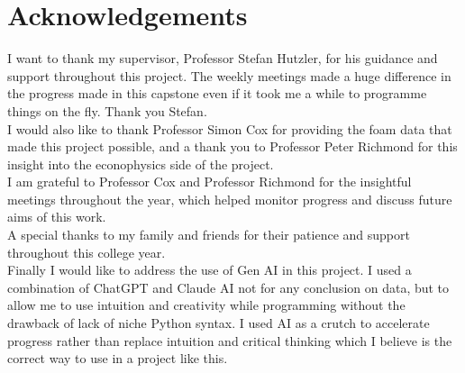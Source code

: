 \section*{Acknowledgements} \label{sec:acknowledgements}

I want to thank my supervisor, Professor Stefan Hutzler, for his guidance and support throughout this project. The weekly meetings made a huge difference in the progress made in this capstone even if it took me a while to programme things on the fly. Thank you Stefan.\\

I would also like to thank Professor Simon Cox for providing the foam data that made this project possible, and a thank you to Professor Peter Richmond for this insight into the econophysics side of the project.\\

I am grateful to Professor Cox and Professor Richmond for the insightful meetings throughout the year, which helped monitor progress and discuss future aims of this work.\\

A special thanks to my family and friends for their patience and support throughout this college year.\\

Finally I would like to address the use of Gen AI in this project. I used a combination of ChatGPT and Claude AI not for any conclusion on data, but to allow me to use intuition and creativity while programming without the drawback of lack of niche Python syntax. I used AI as a crutch to accelerate progress rather than replace intuition and critical thinking which I believe is the correct way to use in a project like this.\\

